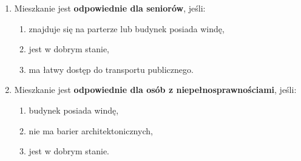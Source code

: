 \begin{enumerate}[label=N\arabic*.]
    \item Mieszkanie jest \textbf{odpowiednie dla seniorów}, jeśli:
    \begin{enumerate}[label=\arabic*.]
        \item znajduje się na parterze lub budynek posiada windę,
        \item jest w dobrym stanie,
        \item ma łatwy dostęp do transportu publicznego.
    \end{enumerate}
    \item Mieszkanie jest \textbf{odpowiednie dla osób z niepełnosprawnościami}, jeśli:
    \begin{enumerate}[label=\arabic*.]
        \item budynek posiada windę,
        \item nie ma barier architektonicznych,
        \item jest w dobrym stanie.
    \end{enumerate}
\end{enumerate}

